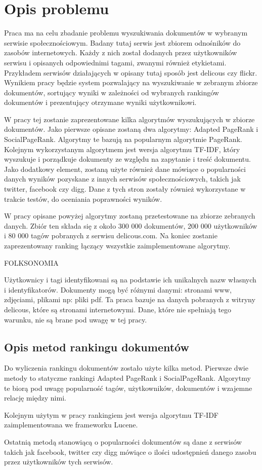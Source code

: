\chapter{Opis problemu}

Praca ma na celu zbadanie problemu wyszukiwania dokumentów w wybranym serwisie społecznościowym. Badany tutaj serwis jest zbiorem odnośników do zasobów internetowych. Każdy z nich został dodanych przez użytkowników serwisu i opisanych odpowiednimi tagami, zwanymi również etykietami. Przykładem serwisów działających w opisany tutaj sposób jest delicous czy flickr. Wynikiem pracy będzie system pozwalający na wyszukiwanie w zebranym zbiorze dokumentów, sortujący wyniki w zależności od wybranych rankingów dokumentów i prezentujący otrzymane wyniki użytkownikowi.

W pracy tej zostanie zaprezentowane kilka algorytmów wyszukujących w zbiorze dokumentów. Jako pierwsze opisane zostaną dwa algorytmy: Adapted PageRank i SocialPageRank. Algorytmy te bazują na popularnym algorytmie PageRank.  Kolejnym wykorzystanym algorytmem jest wersja algorytmu TF-IDF, który wyszukuje i porządkuje dokumenty ze względu na zapytanie i treść dokumentu. Jako dodatkowy element, zostaną użyte również dane mówiące o popularności danych wyników pozyskane z innych serwisów społecznościowych, takich jak twitter, facebook czy digg. Dane z tych stron zostały również wykorzystane w trakcie testów, do oceniania poprawności wyników.

W pracy opisane powyżej algorytmy zostaną przetestowane na zbiorze zebranych danych. Zbiór ten składa się z około 300 000 dokumentów, 200 000 użytkowników i 80 000 tagów pobranych z serwisu delicous.com. Na koniec zostanie zaprezentowany ranking łączący wszystkie zaimplementowane algorytmy. 



FOLKSONOMIA

Użytkownicy i tagi identyfikowani są na podstawie ich unikalnych nazw własnych i identyfikatorów. Dokumenty mogą być różnymi danymi: stronami www, zdjęciami, plikami np: pliki pdf. Ta praca bazuje na danych pobranych z witryny delicous, które są stronami internetowymi. Dane, które nie spełniają tego warunku, nie są brane pod uwagę w tej pracy. 

\section{Opis metod rankingu dokumentów}

Do wyliczenia rankingu dokumentów zostało użyte kilka metod. Pierwsze dwie metody to statyczne rankingi Adapted PageRank i SocialPageRank. Algorytmy te biorą pod uwagę popularność tagów, użytkowników, dokumentów i wzajemne relację między nimi. 

Kolejnym użytym w pracy rankingiem jest wersja algorytmu TF-IDF zaimplementowana we frameworku Lucene. 

Ostatnią metodą stanowiącą o popularności dokumentów są dane z serwisów takich jak facebook, twitter czy digg mówiące o ilości udostępnień danego zasobu przez użytkowników tych serwisów. 





